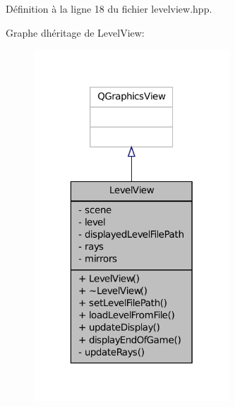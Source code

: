 Définition à la ligne 18 du fichier levelview.\+hpp.



Graphe d\textquotesingle{}héritage de Level\+View\+:\nopagebreak
\begin{figure}[H]
\begin{center}
\leavevmode
\includegraphics[width=208pt]{df/d61/classLevelView__inherit__graph}
\end{center}
\end{figure}


